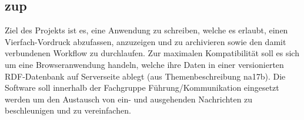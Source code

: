 \subsection{zup}
Ziel des Projekts ist es, eine Anwendung zu schreiben, welche es erlaubt, einen Vierfach-Vordruck abzufassen, anzuzeigen und zu archivieren sowie den damit verbundenen Workflow zu durchlaufen. 
Zur maximalen Kompatibilität soll es sich um eine Browseranwendung handeln, welche ihre Daten in einer versionierten RDF-Datenbank auf Serverseite ablegt (aus Themenbeschreibung na17b). 
Die Software soll innerhalb der Fachgruppe Führung/Kommunikation eingesetzt werden um den Austausch von ein- und ausgehenden Nachrichten zu beschleunigen und zu vereinfachen.